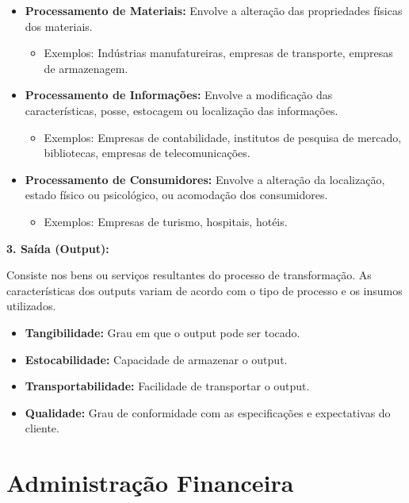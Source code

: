 \documentclass{article}
\begin{document}
\begin{itemize}
\item \textbf{Processamento de Materiais:} Envolve a alteração das propriedades físicas dos materiais.
    \begin{itemize}
    \item Exemplos: Indústrias manufatureiras, empresas de transporte, empresas de armazenagem.
    \end{itemize}
\item \textbf{Processamento de Informações:} Envolve a modificação das características, posse, estocagem ou localização das informações.
    \begin{itemize}
    \item Exemplos: Empresas de contabilidade, institutos de pesquisa de mercado, bibliotecas, empresas de telecomunicações.
    \end{itemize}
\item \textbf{Processamento de Consumidores:} Envolve a alteração da localização, estado físico ou psicológico, ou acomodação dos consumidores.
    \begin{itemize}
    \item Exemplos: Empresas de turismo, hospitais, hotéis.
    \end{itemize}
\end{itemize}

\textbf{3. Saída (Output):}

Consiste nos bens ou serviços resultantes do processo de transformação. As características dos outputs variam de acordo com o tipo de processo e os insumos utilizados.

\begin{itemize}
\item \textbf{Tangibilidade:} Grau em que o output pode ser tocado.
\item \textbf{Estocabilidade:} Capacidade de armazenar o output.
\item \textbf{Transportabilidade:} Facilidade de transportar o output.
\item \textbf{Qualidade:} Grau de conformidade com as especificações e expectativas do cliente.
\end{itemize}

\section{Administração Financeira}
\end{document}
